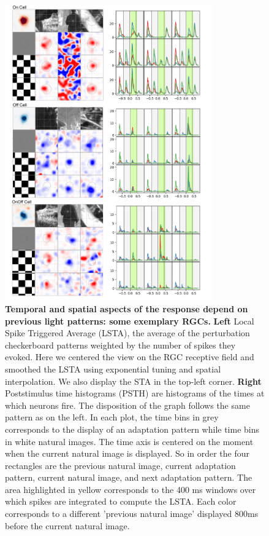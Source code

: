 \begin{figure}
    \centering
    \vspace*{-3cm}
    \includegraphics[width=0.8\textwidth]{pics/ExamplePSTHLSTA.png}
    \caption{\textbf{Temporal and spatial aspects of the response depend on
            previous light patterns: some
            exemplary RGCs.} \small	   \textbf{Left} Local Spike Triggered
        Average (LSTA), the average of the
        perturbation checkerboard patterns weighted by the number of spikes
        they
        evoked. Here we centered the view on the RGC receptive field and
        smoothed the
        LSTA using exponential tuning and spatial interpolation. We also
        display the STA in the top-left corner.
        \textbf{Right} Poststimulus time histograms
        (PSTH) are
        histograms of the times at which neurons fire.
        The disposition of the graph follows the same pattern as on the left.
        In each plot, the time
        bins in
        grey corresponds to the display of an adaptation pattern while time
        bins
        in
        white natural images.
        The time axis is centered on the moment when the current natural image
        is displayed. So in order the four rectangles are the previous natural
        image,
        current adaptation pattern, current natural image, and next adaptation
        pattern.
        The area highlighted in yellow corresponds to the 400 ms windows over
        which
        spikes are integrated to compute the LSTA.
        Each color corresponds to a different 'previous natural image'
        displayed 800ms before the current natural image.}
    \label{fig:CellExample}
\end{figure}

